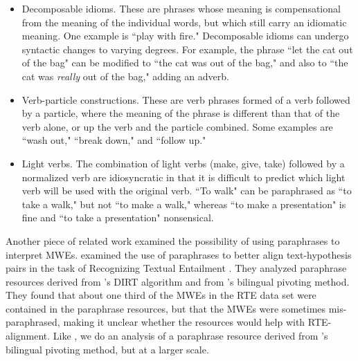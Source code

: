 \documentclass[11pt]{article}
\begin{document}
\begin{itemize}
\item Decomposable idioms. These are phrases whose meaning is compensational from the meaning of the individual words, but which still carry  an idiomatic meaning. One example is ``play with fire."  Decomposable idioms can undergo syntactic changes to varying degrees. For example, the phrase ``let the cat out of the bag" can be modified to ``the cat was out of the bag," and also to ``the cat was \textit{really} out of the bag," adding an adverb. 

\item Verb-particle constructions. These are verb phrases formed of a verb followed by a particle, where the meaning of the phrase is different than that of the verb alone, or up the verb and the particle combined. Some examples are ``wash out," ``break down," and ``follow up." 

\item Light verbs. The combination of light verbs (make, give, take) followed by a normalized verb 
are idiosyncratic in that it is difficult to predict which light verb will be used with the original verb.  ``To walk" can be paraphrased as ``to take a walk," but not ``to make a walk," whereas ``to make a presentation" is fine and ``to take a presentation" nonsensical.
\end{itemize}

Another piece of related work examined the possibility of using paraphrases to interpret MWEs.   examined the use of paraphrases to better align text-hypothesis pairs in the task of Recognizing Textual Entailment \cite{dagan2006pascal}.  They analyzed paraphrase resources derived from 's DIRT algorithm and from 's bilingual pivoting method.  They found that about one third of the MWEs in the RTE data set were contained in the paraphrase resources, but that the MWEs were sometimes mis-paraphrased, making it unclear whether the resources would help with RTE-alignment.  Like , we do an analysis of a paraphrase resource derived from 's bilingual pivoting method, but at a larger scale.

\end{document}
